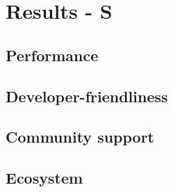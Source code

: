 \chapter{Results - S}%
%

\section{Performance}
\section{Developer-friendliness}
\section{Community support}
\section{Ecosystem}
